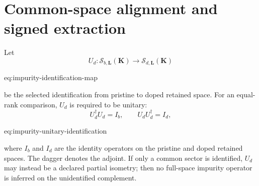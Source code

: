 \section{Common-space alignment and signed extraction}

Let
\begin{equation}
    U_d:
    \mathcal S_{b,\mathbf L}(\mathbf K)
    \longrightarrow
    \mathcal S_{d,\mathbf L}(\mathbf K)
    \label{eq:impurity-identification-map}
\end{equation}
\begin{equationterms}{eq:impurity-identification-map}
\end{equationterms}
be the selected identification from pristine to doped retained space. For an
equal-rank comparison, $U_d$ is required to be unitary:
\begin{equation}
    U_d^{\dagger}U_d=I_b,
    \qquad
    U_dU_d^{\dagger}=I_d,
    \label{eq:impurity-unitary-identification}
\end{equation}
\begin{equationterms}{eq:impurity-unitary-identification}
\end{equationterms}
where $I_b$ and $I_d$ are the identity operators on the pristine and doped
retained spaces. The dagger denotes the adjoint. If only a common sector is
identified, $U_d$ may instead be a declared partial isometry; then no full-space
impurity operator is inferred on the unidentified complement.

